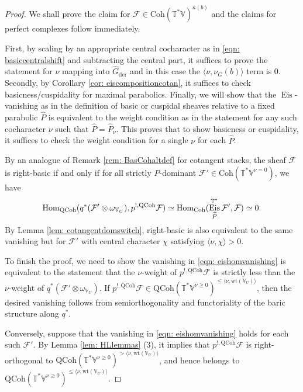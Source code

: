 \documentclass{amsart}
\theoremstyle{definition}
\theoremstyle{remark}
\numberwithin{equation}{section}
\newcommand{\der}{\mathrm{der}}
\newcommand{\mc}{\mathcal}
\newcommand{\Hom}{\mathrm{Hom}}
\newcommand{\wh}{\widehat}
\newcommand{\QCoh}{\mathrm{QCoh}}
\DeclareMathOperator{\Eis}{\mathrm{Eis}}
\newcommand{\Coh}{\mathrm{Coh}}
\newcommand{\V}{\mathbb{V}}
\newcommand{\T}{\mathbb{T}}
\newcommand{\wt}{\mathrm{wt}}
\begin{document}
\begin{proof}
We shall prove the claim for $\mc F\in \Coh(\T^*\V)^{\kappa (b)}$ and the claims for perfect complexes follow immediately. 

First, by scaling by an appropriate central cocharacter as in \eqref{eqn: basiccentralshift} and subtracting the central part, it suffices to prove the statement for $\nu$ mapping into $\wh{G}_{\der}$ and in this case the $\langle \nu, \nu_G(b)\rangle$ term is $0$. Secondly, by Corollary \ref{cor: eiscompositioncotan}, it suffices to check basicness/cuspidality for maximal parabolics. Finally, we will show that the $\Eis$-vanishing as in the definition of basic or cuspidal sheaves relative to a fixed parabolic $\wh{P}$ is equivalent to the weight condition as in the statement for any such cocharacter $\nu$ such that $\wh{P} = \wh{P}_{\nu}$. This proves that to show basicness or cuspidality, it suffices to check the weight condition for a single $\nu$ for each $\wh{P}$.

By an analogue of Remark \ref{rem: BasCohaltdef} for cotangent stacks, the sheaf $\mc{F}$ is right-basic if and only if for all strictly $\wh{P}$-dominant $\mc{F'} \in \Coh(\T^{\ast}\V^{\nu = 0})$, we have 
 \begin{equation}{\label{eqn: eishomvanishing}}
   \Hom_{\QCoh}(q^{\ast} (\mc{F}' \otimes \omega_{\V_U}), p^{!,\QCoh}\mc{F})\simeq \Hom_{\Coh}(\Eis^{\T^*}_{\wh P} \mc{F}' , \mc{F}) \simeq 0.
 \end{equation}
By Lemma \ref{lem: cotangentdomswitch}, right-basic is also equivalent to the same vanishing but for $\mc{F'}$ with central character $\chi$ satisfying $\langle \nu, \chi \rangle > 0$. 

To finish the proof, we need to show the vanishing in \eqref{eqn: eishomvanishing} is equivalent to the statement that the $\nu$-weight of $p^{!,\QCoh}\mc{F}$ is strictly less than the $\nu$-weight of $q^{\ast} (\mc{F}' \otimes \omega_{\V_U})$. If $p^{!,\QCoh}\mc{F} \in \QCoh(\T^{\ast}\V^{\nu \geq 0})^{ \leq \langle \nu, \wt(\V_U)\rangle}$, then the desired vanishing follows from semiorthogonality and functoriality of the baric structure along $q^{\ast}$.

Conversely, suppose that the vanishing in \eqref{eqn: eishomvanishing} holds for each such $\mc{F}'$. By Lemma \ref{lem: HLlemmas} (3), it implies that $p^{!,\QCoh}\mc{F}$ is right-orthogonal to $\QCoh(\T^*\V^{\nu \geq 0})^{> \langle \nu, \wt(\V_U)\rangle}$, and hence belongs to $\QCoh(\T^*\V^{\nu\geq 0})^{\leq \langle \nu, \wt(\V_U)\rangle}$. 
\end{proof}
\end{document}

